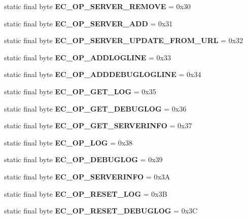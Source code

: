 \begin{DoxyCompactItemize}
\item 
static final byte {\bfseries EC\_\-OP\_\-SERVER\_\-REMOVE} = 0x30\label{interfaceECCodes_a244b74a17cb6299af6e1bd310d10a470}

\item 
static final byte {\bfseries EC\_\-OP\_\-SERVER\_\-ADD} = 0x31\label{interfaceECCodes_a7f8dfadd9621c2bd5e51733e9a5478a0}

\item 
static final byte {\bfseries EC\_\-OP\_\-SERVER\_\-UPDATE\_\-FROM\_\-URL} = 0x32\label{interfaceECCodes_a2cd8781b0a7fcca3f474658ed6230c8e}

\item 
static final byte {\bfseries EC\_\-OP\_\-ADDLOGLINE} = 0x33\label{interfaceECCodes_ae06aa6d1347c044ef1fdbb6eb447ef36}

\item 
static final byte {\bfseries EC\_\-OP\_\-ADDDEBUGLOGLINE} = 0x34\label{interfaceECCodes_a5f84dc954f8eb8d408db994cddda18a8}

\item 
static final byte {\bfseries EC\_\-OP\_\-GET\_\-LOG} = 0x35\label{interfaceECCodes_ab954d66ffa8134d99c7b728e3f616345}

\item 
static final byte {\bfseries EC\_\-OP\_\-GET\_\-DEBUGLOG} = 0x36\label{interfaceECCodes_a8ef3c315c89c26e90d36be47bfb9a439}

\item 
static final byte {\bfseries EC\_\-OP\_\-GET\_\-SERVERINFO} = 0x37\label{interfaceECCodes_a746a96729e68a426a33a71fd0da9558a}

\item 
static final byte {\bfseries EC\_\-OP\_\-LOG} = 0x38\label{interfaceECCodes_a1500ea1510c60da1b75053bc5efa152d}

\item 
static final byte {\bfseries EC\_\-OP\_\-DEBUGLOG} = 0x39\label{interfaceECCodes_ac75cca78381c5bfe06ba8d534aa334fc}

\item 
static final byte {\bfseries EC\_\-OP\_\-SERVERINFO} = 0x3A\label{interfaceECCodes_a7f04560425f6a0f7fa32dfe9f3f995e0}

\item 
static final byte {\bfseries EC\_\-OP\_\-RESET\_\-LOG} = 0x3B\label{interfaceECCodes_ae04d746389dbf9e0d5d2b8f2d29998c5}

\item 
static final byte {\bfseries EC\_\-OP\_\-RESET\_\-DEBUGLOG} = 0x3C\label{interfaceECCodes_a3f0be6126a90ea30a58b44b99c0d3686}


\end{DoxyCompactItemize}
